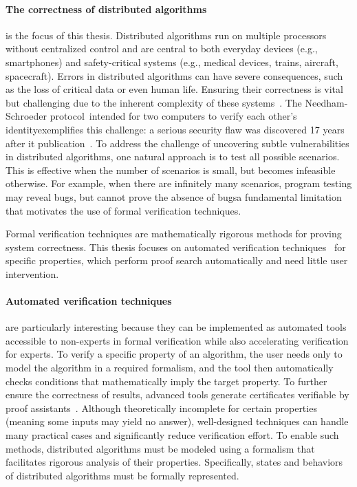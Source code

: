 
\paragraph{The correctness of distributed algorithms} is the focus of this thesis. 
Distributed algorithms run on multiple processors without centralized control and are central to both everyday devices (e.g., smartphones) and safety-critical systems (e.g., medical devices, trains, aircraft, spacecraft).
Errors in distributed algorithms can have severe consequences, such as the loss of critical data or even human life. Ensuring their correctness is vital but challenging due to the inherent complexity of these systems~\cite{heiser2010theroad, lamport2019thebyzantine}. 
The Needham-Schroeder protocol~\cite{needham1978using}\textemdash intended for two computers to verify each other's identity\textemdash exemplifies this challenge: a serious security flaw was discovered 17 years after it publication~\cite{lowe1996breaking}.
To address the challenge of uncovering subtle vulnerabilities in distributed algorithms, one natural approach is to test all possible scenarios. This is effective when the number of scenarios is small, but becomes infeasible otherwise. For example, when there are infinitely many scenarios, program testing may reveal bugs, but cannot prove the absence of bugs\textemdash a fundamental limitation that motivates the use of formal verification techniques.

Formal verification techniques are mathematically rigorous methods for proving system correctness. 
This thesis focuses on automated verification techniques~\cite{clarke2018model, contejean2011automated, cortier2014formal} for specific properties, which perform proof search automatically and need little user intervention.

\paragraph{Automated verification techniques} are particularly interesting because they can be implemented as automated tools accessible to non-experts in formal verification while also accelerating verification for experts.
To verify a specific property of an algorithm, the user needs only to model the algorithm in a required formalism, and the tool then automatically checks conditions that mathematically imply the target property. To further ensure the correctness of results, advanced tools generate certificates verifiable by proof assistants~\cite{contejean2011automated}. 
Although theoretically incomplete for certain properties (meaning some inputs may yield no answer), well-designed techniques can handle many practical cases and significantly reduce verification effort.
To enable such methods, distributed algorithms must be modeled using a formalism that facilitates rigorous analysis of their properties. Specifically, states and behaviors of distributed algorithms must be formally represented.

